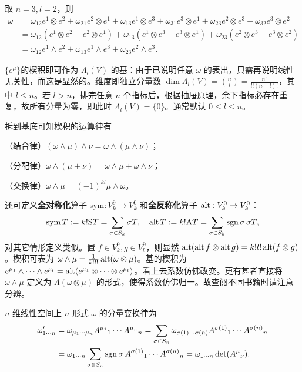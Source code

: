\begin{eg}
    取 $n=3,l=2$，则
\begin{align*}
    \omega&=\omega_{12}e^1\otimes e^2+\omega_{21}e^2\otimes e^1+\omega_{13}e^1\otimes e^3+\omega_{31}e^3\otimes e^1+\omega_{23}e^2\otimes e^3+\omega_{32}e^3\otimes e^2\\
    &=\omega_{12}(e^1\otimes e^2-e^2\otimes e^1)+\omega_{13}(e^1\otimes e^3-e^3\otimes e^1)+\omega_{23}(e^2\otimes e^3-e^3\otimes e^2)\\
    &=\omega_{12}e^1\wedge e^2+\omega_{13}e^1\wedge e^3+\omega_{23}e^2\wedge e^3.
\end{align*}
\end{eg}

$\{e^\mu\}$的楔积即可作为 $\Lambda_l(V)$ 的基：由于已说明任意 $\omega$ 的表出，只需再说明线性无关性，而这是显然的。维度即独立分量数 $\dim\Lambda_l(V)=\binom{n}{l}=\frac{n!}{l!(n-l)!}$，其中 $l\leqslant n$。若 $l>n$，排完任意 $n$ 个指标后，根据抽屉原理，余下指标必存在重复，故所有分量为零，即此时 $\Lambda_l(V)=\{0\}$。通常默认 $0\leqslant l\leqslant n$。
\begin{theorem}拆到基底可知楔积的运算律有

    （结合律）$(\omega\wedge\mu)\wedge\nu=\omega\wedge(\mu\wedge\nu)$；

    （分配律）$\omega\wedge(\mu+\nu)=\omega\wedge\mu+\omega\wedge\nu$；

    （交换律）$\omega\wedge\mu=(-1)^{kl}\mu\wedge\omega$。
\end{theorem}

还可定义\textbf{全对称化}算子 $\mathrm{sym}:V^0_k\to V^0_k$ 和\textbf{全反称化}算子 $\operatorname{alt}:V^0_k\to V^0_k$：
\[\operatorname{sym} T:=k!\mathrm{S} T=\sum_{\sigma\in S_k} \sigma T,\quad \operatorname{alt} T:=k!\mathrm{A} T=\sum_{\sigma\in S_k} \operatorname{sgn}\sigma\,\sigma T,\]
对其它情形定义类似。置 $f\in V^0_k,g\in V^0_l$，则显然 $\operatorname{alt}(\operatorname{alt} f\otimes\operatorname{alt} g)=k!l!\operatorname{alt}(f\otimes g)$。楔积可表为 $\omega\wedge\mu=\frac{1}{k!l!}\operatorname{alt}(\omega\otimes\mu)$。基的楔积为 $e^{\mu_{1}}\wedge\cdots\wedge e^{\mu_{l}}=\operatorname{alt}( e^{\mu_{1}}\otimes\cdots\otimes e^{\mu_{l}})$。看上去系数仿佛改变。更有甚者直接将 $\omega\wedge\mu$ 定义为 $\Lambda(\omega\otimes\mu)$ 的形式，使得系数仿佛归一。故查阅不同书籍时请注意分辨。

\begin{theorem}
    $n$ 维线性空间上 $n$-形式 $\omega$ 的分量变换律为
    \begin{align}
        \omega'_{1\cdots n}&=\omega_{\mu_1\cdots\mu_n} A^{\mu_1}{}_{1} \cdots A^{\mu_n}{}_{n}=\sum_{\sigma\in S_n}\omega_{\sigma(1)\cdots\sigma(n)} A^{\sigma(1)}{}_{1} \cdots A^{\sigma(n)}{}_{n}\nonumber\\&=\omega_{1\cdots n}\sum_{\sigma\in S_n}\operatorname{sgn}\sigma\, A^{\sigma(1)}{}_{1} \cdots A^{\sigma(n)}{}_{n}=\omega_{1\cdots n} \det(A^{\mu}{}_{\nu}).
    \end{align}
\end{theorem}

